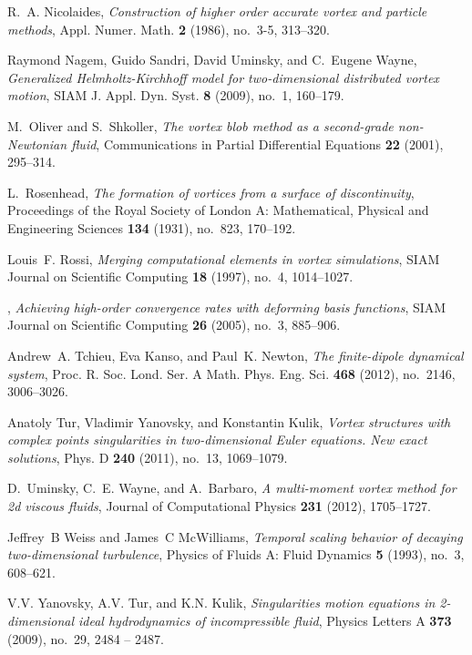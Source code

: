 \documentclass[12pt]{amsart}
\theoremstyle{remark}
\begin{document}
\begin{thebibliography}{FDMM91}
R.~A. Nicolaides, \emph{Construction of higher order accurate vortex and
  particle methods}, Appl. Numer. Math. \textbf{2} (1986), no.~3-5, 313--320.

Raymond Nagem, Guido Sandri, David Uminsky, and C.~Eugene Wayne,
  \emph{Generalized {H}elmholtz-{K}irchhoff model for two-dimensional
  distributed vortex motion}, SIAM J. Appl. Dyn. Syst. \textbf{8} (2009),
  no.~1, 160--179. 

M.~Oliver and S.~Shkoller, \emph{{The vortex blob method as a second-grade
  non-Newtonian fluid}}, Communications in Partial Differential Equations
  \textbf{22} (2001), 295--314.

L.~Rosenhead, \emph{The formation of vortices from a surface of discontinuity},
  Proceedings of the Royal Society of London A: Mathematical, Physical and
  Engineering Sciences \textbf{134} (1931), no.~823, 170--192.

Louis~F. Rossi, \emph{Merging computational elements in vortex simulations},
  SIAM Journal on Scientific Computing \textbf{18} (1997), no.~4, 1014--1027.

\bysame, \emph{Achieving high-order convergence rates with deforming basis
  functions}, SIAM Journal on Scientific Computing \textbf{26} (2005), no.~3,
  885--906.

Andrew~A. Tchieu, Eva Kanso, and Paul~K. Newton, \emph{The finite-dipole
  dynamical system}, Proc. R. Soc. Lond. Ser. A Math. Phys. Eng. Sci.
  \textbf{468} (2012), no.~2146, 3006--3026. 

Anatoly Tur, Vladimir Yanovsky, and Konstantin Kulik, \emph{Vortex structures
  with complex points singularities in two-dimensional {E}uler equations. {N}ew
  exact solutions}, Phys. D \textbf{240} (2011), no.~13, 1069--1079.

D.~Uminsky, C.~E. Wayne, and A.~Barbaro, \emph{A multi-moment vortex method for
  2d viscous fluids}, Journal of Computational Physics \textbf{231} (2012),
  1705--1727.

Jeffrey~B Weiss and James~C McWilliams, \emph{Temporal scaling behavior of
  decaying two-dimensional turbulence}, Physics of Fluids A: Fluid Dynamics
  \textbf{5} (1993), no.~3, 608--621.

V.V. Yanovsky, A.V. Tur, and K.N. Kulik, \emph{Singularities motion equations
  in 2-dimensional ideal hydrodynamics of incompressible fluid}, Physics
  Letters A \textbf{373} (2009), no.~29, 2484 -- 2487.

\end{thebibliography}
\end{document}
